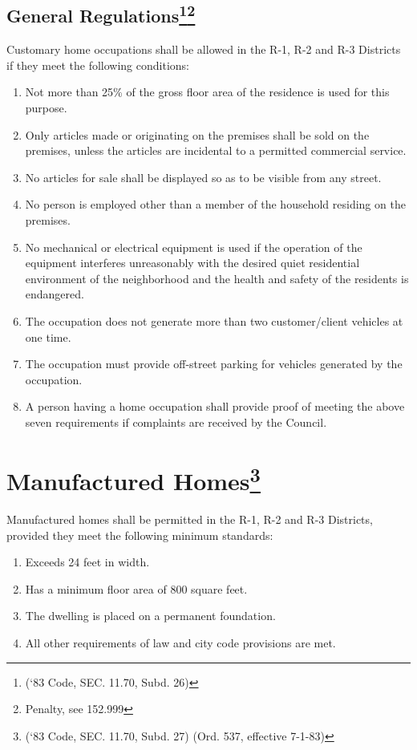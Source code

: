 \subsection{General Regulations\footnote{(‘83 Code, SEC. 11.70, Subd. 26)}\footnote{Penalty, see 152.999}}
Customary home occupations shall be allowed in the R-1, R-2 and R-3 Districts if they meet the following conditions:
\begin{enumerate}[{\indent}1)]
    \item Not more than 25\% of the gross floor area of the residence is used for this purpose.
    \item Only articles made or originating on the premises shall be sold on the premises, unless the articles are incidental to a permitted commercial service.
    \item No articles for sale shall be displayed so as to be visible from any street.
    \item No person is employed other than a member of the household residing on the premises.
    \item No mechanical or electrical equipment is used if the operation of the equipment interferes unreasonably with the desired quiet residential environment of the neighborhood and the health and safety of the residents is endangered.
    \item The occupation does not generate more than two customer/client vehicles at one time.
    \item The occupation must provide off-street parking for vehicles generated by the occupation.
    \item A person having a home occupation shall provide proof of meeting the above seven requirements if complaints are received by the Council.
\end{enumerate}
\section{Manufactured Homes\footnote{(‘83 Code, SEC. 11.70, Subd. 27)  (Ord. 537, effective 7-1-83)}}
Manufactured homes shall be permitted in the R-1, R-2 and R-3 Districts, provided they meet the following minimum standards:
\begin{enumerate}[{\indent}A)]
    \item Exceeds 24 feet in width.
    \item Has a minimum floor area of 800 square feet.
    \item The dwelling is placed on a permanent foundation.
    \item All other requirements of law and city code provisions are met.
\end{enumerate}
